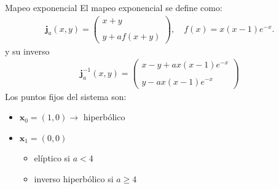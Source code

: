 \documentclass[11pt]{beamer}
\theoremstyle{definition}
\begin{document}
\begin{frame}{Mapeo exponencial}
El mapeo exponencial se define como:
\begin{eqnarray}
\mathbf{j}_{a}(x,y)=\left(\begin{array}{lcc}
x+y\\
\\ y+af(x+y)
\end{array}\right), \quad f(x)=x(x-1)e^{-x}.
\label{Jung}
\end{eqnarray}
y su inverso
\begin{eqnarray}
\mathbf{j}^{-1}_{a}(x,y)=\left(\begin{array}{lcc}
x-y+ax(x-1)e^{-x}\\
\\ y-ax(x-1)e^{-x}
\end{array}\right)
\label{jungI}
\end{eqnarray}
Los puntos fijos del sistema son:
\begin{itemize}
\item $\mathbf{x}_{0}=(1,0) \rightarrow$ hiperb\'olico
\item $\mathbf{x}_{1}=(0,0)$  
\begin{itemize}
\item el\'iptico si $a<4$
\item inverso hiperb\'olico si $a \geq 4$
\end{itemize}
\end{itemize}

\end{frame}
\end{document}
